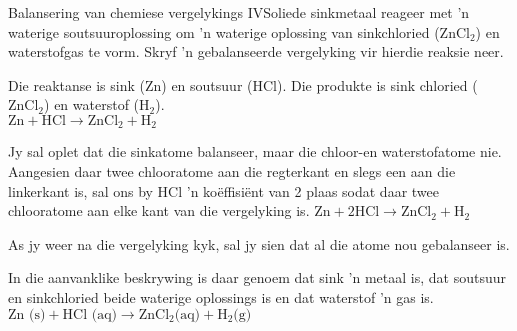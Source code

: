       \noindent
\begin{wex}{Balansering van chemiese vergelykings IV}{Soliede sinkmetaal reageer met  'n waterige soutsuuroplossing om 'n waterige oplossing van  sinkchloried ($\text{ZnCl}_{2}$) en waterstofgas te vorm. Skryf 'n gebalanseerde vergelyking vir hierdie reaksie neer.}{
Die reaktanse is sink ($\text{Zn}$) en soutsuur ($\text{HCl}$). Die produkte is sink chloried ($\text{ZnCl}_{2}$) en waterstof ($\text{H}_{2}$).\\


${\text{Zn} + \text{HCl} \rightarrow \text{ZnCl}_{2} + \text{H}_{2}}$


Jy sal oplet dat die sinkatome balanseer, maar die chloor-en waterstofatome nie. Aangesien daar twee chlooratome aan die regterkant en slegs een aan die linkerkant is, sal ons by HCl 'n ko\"{e}ffisiënt van 2 plaas sodat daar twee chlooratome aan elke kant van die  vergelyking is.
${\text{Zn} + 2\text{HCl} \rightarrow \text{ZnCl}_{2} + \text{H}_{2}}$


 As jy weer na die vergelyking kyk, sal jy sien dat al die atome nou gebalanseer is.


In die aanvanklike beskrywing is daar genoem dat sink 'n metaal is, dat soutsuur en sinkchloried beide waterige oplossings is  en dat waterstof 'n gas is.
$\text{Zn (s)} + \text{HCl (aq)} \rightarrow \text{ZnCl}_{2} \text{(aq)} + \text{H}_{2} \text{(g)}$
}
\end{wex}
    \noindent
\par


